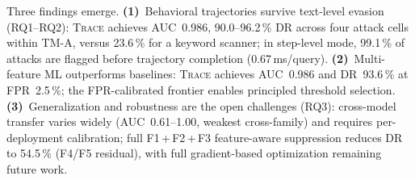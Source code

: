 \documentclass[conference]{IEEEtran}
\begin{document}
Three findings emerge.
\textbf{(1)}~Behavioral trajectories survive text-level evasion
(RQ1--RQ2): \textsc{Trace} achieves AUC~0.986, 90.0--96.2\,\% DR
across four attack cells within TM-A, versus 23.6\,\% for a keyword
scanner; in step-level mode, 99.1\,\% of attacks are flagged before
trajectory completion (0.67\,ms/query).
\textbf{(2)}~Multi-feature ML outperforms baselines: \textsc{Trace}
achieves AUC~0.986 and DR~93.6\,\% at FPR~2.5\,\%; the FPR-calibrated
frontier enables principled threshold selection.
\textbf{(3)}~Generalization and robustness are the open challenges
(RQ3): cross-model transfer varies widely (AUC~0.61--1.00, weakest
cross-family) and requires per-deployment calibration; full
F1\,+\,F2\,+\,F3 feature-aware suppression reduces DR to 54.5\,\%
(F4/F5 residual), with full gradient-based optimization remaining
future work.




\end{document}
